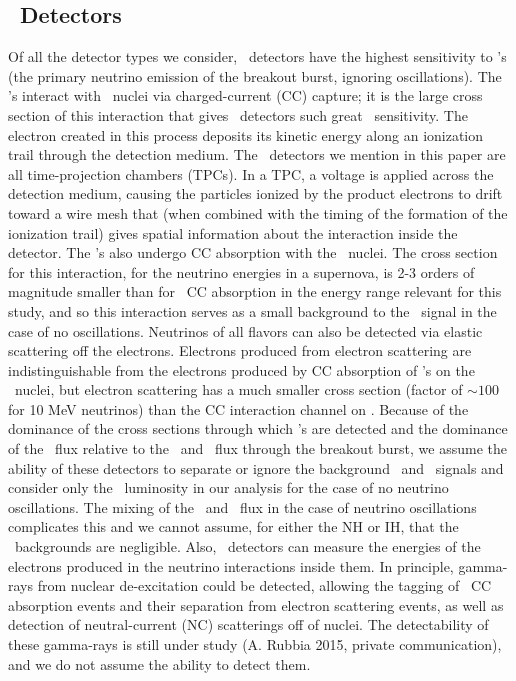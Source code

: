 \subsection{\ Detectors}
Of all the detector types we consider, 
\ detectors have the highest sensitivity to \nue's (the primary
neutrino emission of the breakout burst, ignoring oscillations). The 
\nue's interact
with \ nuclei via charged-current (CC) 
capture; it is the large cross section of
this interaction  that gives \ 
detectors such great \nue\ sensitivity.  The electron created in this
process deposits its kinetic energy 
along an ionization trail through the detection medium.  The \
detectors we mention  in this paper are all time-projection chambers
(TPCs).  In a TPC, a voltage is applied
across the detection medium, causing the particles ionized by the
product electrons to drift
toward a wire mesh that (when combined with the timing of the
formation of the ionization trail) gives spatial information about the
interaction inside the detector.  The \anue's also undergo CC
absorption with the \ar40\ nuclei.  The cross section for this
interaction, for the neutrino energies in a supernova, is 2-3
orders of magnitude smaller than for \nue\ CC absorption
in the energy range relevant for this study,
and so this interaction serves as a small background to the \nue\
signal in the case of no oscillations.  Neutrinos of all flavors can also be
detected  via elastic scattering off the electrons.
Electrons produced from electron scattering are 
indistinguishable from the electrons produced by CC
absorption of \nue's on the \ nuclei, but electron scattering has a
much smaller cross section (factor of ${\sim}100$ for 10 MeV neutrinos) 
than the CC interaction channel on \ar40.
 Because of the dominance of
the cross sections through which \nue's are detected and the dominance
of the \nue\ flux relative to the \anue\ and \nux\ flux through the breakout
burst, we assume the ability of these detectors to separate or ignore
the background \anue\ and \nux\ signals 
and consider only the \nue\ luminosity in our analysis for the case of
no neutrino oscillations.  The mixing of the \nuxpart\ and \nue\ flux
in the case of neutrino oscillations complicates this and we cannot
assume, for either the NH or IH, that the \nuxpart\ backgrounds are negligible. 
Also, \ar40\ detectors can measure
the energies of the electrons produced in the neutrino interactions
inside them.  
In principle, gamma-rays from nuclear de-excitation
could be detected, allowing the tagging of \nue\ CC
absorption events and their separation from electron scattering
events, as well as detection of neutral-current (NC) scatterings off of
nuclei.  The detectability of these gamma-rays is still under study
(A. Rubbia 2015, private communication),
and we do not assume the ability to detect them.

